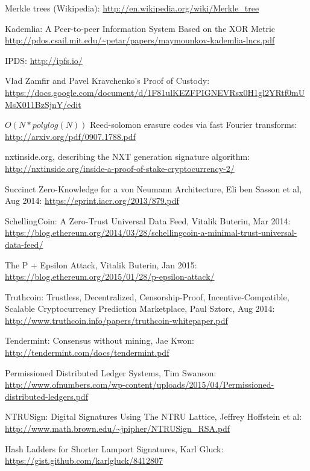 \documentclass[11pt,a4paper]{report}
\theoremstyle{plain}
\theoremstyle{definition}
\theoremstyle{remark}
\begin{document}
\begin{thebibliography}{32}
    Merkle trees (Wikipedia): \url{http://en.wikipedia.org/wiki/Merkle_tree}

    Kademlia: A Peer-to-peer Information System Based on the XOR Metric \url{http://pdos.csail.mit.edu/~petar/papers/maymounkov-kademlia-lncs.pdf}

    IPDS: \url{http://ipfs.io/}

    Vlad Zamfir and Pavel Kravchenko's Proof of Custody: \url{https://docs.google.com/document/d/1F81ulKEZFPIGNEVRsx0H1gl2YRtf0mUMsX011BzSjnY/edit}

    $O(N*polylog(N))$ Reed-solomon erasure codes via fast Fourier transforms: \url{http://arxiv.org/pdf/0907.1788.pdf}

    nxtinside.org, describing the NXT generation signature algorithm: \url{http://nxtinside.org/inside-a-proof-of-stake-cryptocurrency-2/}

    Succinct Zero-Knowledge for a von Neumann Architecture, Eli ben Sasson et al, Aug 2014: \url{https://eprint.iacr.org/2013/879.pdf}

    SchellingCoin: A Zero-Trust Universal Data Feed, Vitalik Buterin, Mar 2014: \url{https://blog.ethereum.org/2014/03/28/schellingcoin-a-minimal-trust-universal-data-feed/}

    The P + Epsilon Attack, Vitalik Buterin, Jan 2015: \url{https://blog.ethereum.org/2015/01/28/p-epsilon-attack/}

    Truthcoin: Trustless, Decentralized, Censorship-Proof, Incentive-Compatible, Scalable Cryptocurrency Prediction Marketplace, Paul Sztorc, Aug 2014: \url{http://www.truthcoin.info/papers/truthcoin-whitepaper.pdf}

    Tendermint: Consensus without mining, Jae Kwon: \url{http://tendermint.com/docs/tendermint.pdf}

    Permissioned Distributed Ledger Systems, Tim Swanson: \url{http://www.ofnumbers.com/wp-content/uploads/2015/04/Permissioned-distributed-ledgers.pdf}

    NTRUSign: Digital Signatures Using The NTRU Lattice, Jeffrey Hoffstein et al: \url{http://www.math.brown.edu/~jpipher/NTRUSign_RSA.pdf}

    Hash Ladders for Shorter Lamport Signatures, Karl Gluck: \url{https://gist.github.com/karlgluck/8412807}


\end{thebibliography}
\end{document}
